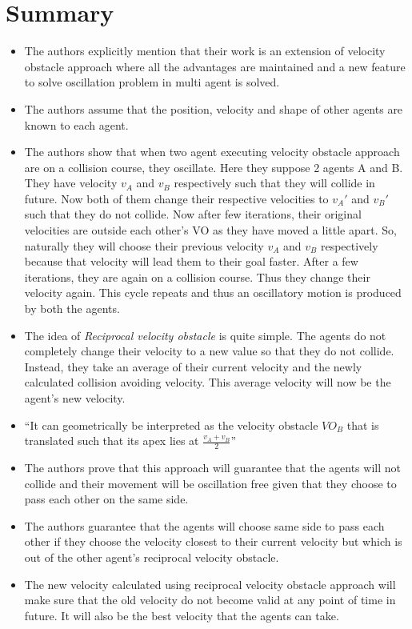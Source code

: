 \documentclass[12pt]{article}
\begin{document}
\section{Summary}
\begin{itemize}
    \item The authors explicitly mention that their work is an extension of velocity obstacle approach\cite{fiorini1998motion} where all the advantages are maintained and a new feature to solve oscillation problem in multi agent is solved.
    \item The authors assume that the position, velocity and shape of other agents are known to each agent.
    \item The authors show that when two agent executing velocity obstacle approach are on a collision course, they oscillate. Here they suppose 2 agents A and B. They have velocity $v_A$ and $v_B$ respectively such that they will collide in future. Now both of them change their respective velocities to $v_A'$ and $v_B'$ such that they do not collide. Now after few iterations, their original velocities are outside each other's VO as they have moved a little apart. So, naturally they will choose their previous velocity $v_A$ and $v_B$ respectively because that velocity will lead them to their goal faster. After a few iterations, they are again on a collision course. Thus they change their velocity again. This cycle repeats and thus an oscillatory motion is produced by both the agents.
    \item The idea of \textit{Reciprocal velocity obstacle} is quite simple. The agents do not completely change their velocity to a new value so that they do not collide. Instead, they take an average of their current velocity and the newly calculated collision avoiding velocity. This average velocity will now be the agent's new velocity.
    \item ``It can geometrically be interpreted as the velocity obstacle $VO_B$ that is translated such that its apex lies at $\frac{v_A + v_B}{2}$''\cite{van2008reciprocal}
    \item The authors prove that this approach will guarantee that the agents will not collide and their movement will be oscillation free given that they choose to pass each other on the same side.
    \item The authors guarantee that the agents will choose same side to pass each other if they choose the velocity closest to their current velocity but which is out of the other agent's reciprocal velocity obstacle.
    \item The new velocity calculated using reciprocal velocity obstacle approach will make sure that the old velocity do not become valid at any point of time in future. It will also be the best velocity that the agents can take.

\end{itemize}
\end{document}
